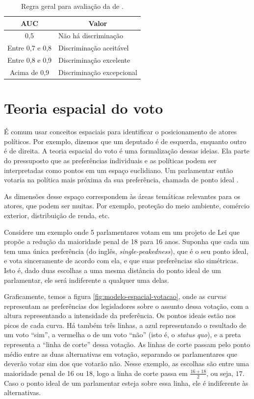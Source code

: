 \documentclass[a4paper,titlepage]{ppgi}\usepackage[]{graphicx}\usepackage[]{color}
\begin{document}
\begin{table}
\centering
\begin{tabular}{c l}
  \acrshort{AUC} & \multicolumn{1}{c}{Valor} \\
  \hline
  0,5 & Não há discriminação \\
  Entre 0,7 e 0,8 & Discriminação aceitável \\
  Entre 0,8 e 0,9 & Discriminação excelente \\
  Acima de 0,9 & Discriminação excepcional \\
\end{tabular}
\caption{Regra geral para avaliação da  de .}
\label{table:valores-auc}
\end{table}

\section{Teoria espacial do voto}
\label{cap:fundamentacao:teoria-espacial-do-voto}



É comum usar conceitos espaciais para identificar o posicionamento de
atores políticos. Por exemplo, dizemos que um deputado é de esquerda, enquanto
outro é de direita. A teoria espacial do voto é uma formalização dessas ideias.
Ela parte do pressuposto que as preferências individuais e as políticas podem
ser interpretadas como pontos em um espaço euclidiano. Um parlamentar então
votaria na política mais próxima da sua preferência, chamada de ponto ideal
\cite{Leoni2002}.

As dimensões desse espaço correspondem às áreas temáticas relevantes para os
atores, que podem ser muitas. Por exemplo, proteção do meio ambiente, comércio
exterior, distribuição de renda, etc.

Considere um exemplo onde 5 parlamentares votam em um
projeto de Lei que propõe a redução da maioridade penal de
18 para 16 anos. Suponha
que cada um tem uma única preferência (do inglês, \emph{single-peakedness}),
que é o seu ponto ideal, e vota sinceramente de acordo com ela, e que suas
preferências são simétricas. Isto é, dado duas escolhas a uma mesma distância
do ponto ideal de um parlamentar, ele será indiferente a qualquer uma delas.

Graficamente, temos a figura \ref{fig:modelo-espacial-votacao}, onde as curvas
representam as preferências dos legisladores sobre o assunto dessa votação, com
a altura representando a intensidade da preferência. Os pontos ideais estão nos
picos de cada curva. Há também três linhas, a azul representando o resultado de
um voto ``sim'', a vermelha o de um voto ``não'' (isto é, o \emph{status quo}),
e a preta representa a ``linha de corte'' dessa votação. As linhas de corte
passam pelo ponto médio entre as duas alternativas em votação, separando os
parlamentares que deverão votar sim dos que votarão não. Nesse exemplo, as
escolhas são entre uma maioridade penal de 16 ou
18, logo a linha de corte passa em $\frac{16 +
18}{2}$, ou seja, $17$. Caso o ponto ideal de um parlamentar esteja sobre essa
linha, ele é indiferente às alternativas.
\end{document}
